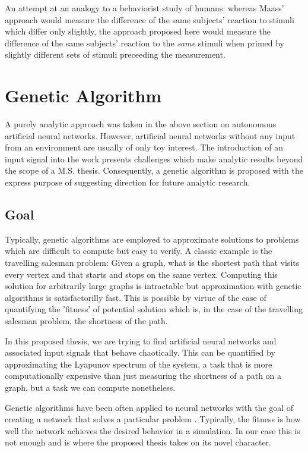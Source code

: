 \documentclass[12pt]{article}
\begin{document}
An attempt
at an analogy to a behaviorist study of humans:  whereas Maass' 
approach would measure the difference of the same subjects' reaction to 
stimuli which differ only slightly, the approach proposed here would measure
the difference of the same subjects' reaction to the \textit{same} stimuli
when primed by slightly different sets of stimuli preceeding the measurement.
\newpage
\section{Genetic Algorithm}
A purely analytic approach was taken in the above section on autonomous 
artificial neural networks.  However, artificial neural networks without any
input from an environment are usually of only toy interest.  
The introduction of an input signal into the
work presents challenges which make analytic results beyond the scope of a
M.S. thesis.  Consequently, a genetic algorithm is proposed with
the express purpose of suggesting direction for future analytic research.

\subsection{Goal}
Typically, genetic algorithms are employed to approximate solutions to problems
which are difficult to compute but easy to verify.  A classic example is the
travelling salesman problem:  Given a graph, what is the shortest path that
visits every vertex and that starts and stops on the same vertex.  Computing
this solution for arbitrarily large graphs is intractable but approximation
with genetic algorithms is satisfactorilly fast.  This is possible by 
virtue of the
ease of quantifying the 'fitness' of potential solution which is, in the case 
of the travelling salesman problem, the shortness of the path.

In this proposed thesis, we are trying to find artificial neural networks
and associated input signals that behave chaotically.  This can be quantified
by approximating the Lyapunov spectrum of the system, a task that is more 
computationally expensive than just measuring the shortness of a path on a
graph, but a task we can compute nonetheless.

Genetic algorithms have been often applied to neural networks with the goal
of creating a network that solves a particular problem \cite{doya}.
Typically, the fitness is how well the network achieves the desired behavior
in a simulation.  In our case this is not enough and is where the proposed
thesis takes on its novel character.
\end{document}
